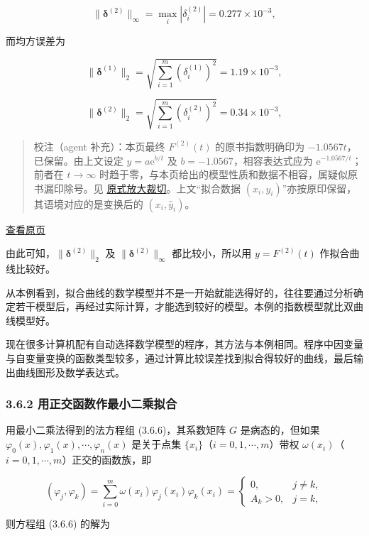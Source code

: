 \documentclass[
  10pt,
  fontset=fandol]{ctexart}
\begin{document}
\[
\|\boldsymbol\delta^{(2)}\|_\infty=\max_i|\delta_i^{(2)}|=0.277\times10^{-3},
\]

而均方误差为

\[
\|\boldsymbol\delta^{(1)}\|_2=\sqrt{\sum_{i=1}^m(\delta_i^{(1)})^2}=1.19\times10^{-3},
\]

\[
\|\boldsymbol\delta^{(2)}\|_2=\sqrt{\sum_{i=1}^m(\delta_i^{(2)})^2}=0.34\times10^{-3},
\]

\begin{quote}
校注（agent 补充）：本页最终 \(F^{(2)}(t)\) 的原书指数明确印为 \(-1.0567t\)，已保留。由上文设定 \(y=a\mathrm e^{b/t}\) 及 \(b=-1.0567\)，相容表达式应为 \(\mathrm e^{-1.0567/t}\)；前者在 \(t\to\infty\) 时趋于零，与本页给出的模型性质和数据不相容，属疑似原书漏印除号。见 \href{../assets/ch03b/p081-exponential-fit.png}{原式放大裁切}。上文``拟合数据 \((x_i,y_i)\)''亦按原印保留，其语境对应的是变换后的 \((x_i,\hat y_i)\)。
\end{quote}

\href{../../source-images/pdf-082.jpeg}{查看原页}

由此可知，\(\|\boldsymbol\delta^{(2)}\|_2\) 及 \(\|\boldsymbol\delta^{(2)}\|_\infty\) 都比较小，所以用 \(y=F^{(2)}(t)\) 作拟合曲线比较好。

从本例看到，拟合曲线的数学模型并不是一开始就能选得好的，往往要通过分析确定若干模型后，再经过实际计算，才能选到较好的模型。本例的指数模型就比双曲线模型好。

现在很多计算机配有自动选择数学模型的程序，其方法与本例相同。程序中因变量与自变量变换的函数类型较多，通过计算比较误差找到拟合得较好的曲线，最后输出曲线图形及数学表达式。

\subsubsection{3.6.2 用正交函数作最小二乘拟合}\label{ux7528ux6b63ux4ea4ux51fdux6570ux4f5cux6700ux5c0fux4e8cux4e58ux62dfux5408}

用最小二乘法得到的法方程组 (3.6.6)，其系数矩阵 \(G\) 是病态的，但如果 \(\varphi_0(x),\varphi_1(x),\cdots,\varphi_n(x)\) 是关于点集 \(\{x_i\}\)（\(i=0,1,\cdots,m\)）带权 \(\omega(x_i)\)（\(i=0,1,\cdots,m\)）正交的函数族，即

\[
(\varphi_j,\varphi_k)=\sum_{i=0}^m\omega(x_i)\varphi_j(x_i)\varphi_k(x_i)=\begin{cases}0,&j\ne k,\\ A_k>0,&j=k,\end{cases}\tag{3.6.8}
\]

则方程组 (3.6.6) 的解为
\end{document}
